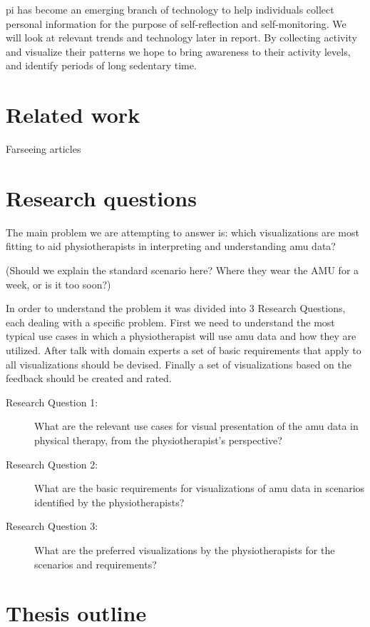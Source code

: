 \gls{pi} has become an emerging branch of technology to help individuals collect personal information for the purpose of self-reflection and self-monitoring. We will look at relevant trends and technology later in report. By collecting activity and visualize their patterns we hope to bring awareness to their activity levels, and identify periods of long sedentary time. 

\section{Related work}
Farseeing articles
\section{Research questions}
The main problem we are attempting to answer is: which visualizations are most fitting to aid physiotherapists in interpreting and understanding \gls{amu} data?

(Should we explain the standard scenario here? Where they wear the AMU for a week, or is it too soon?)

In order to understand the problem it was divided into 3 Research Questions, each dealing with a specific problem. First we need to understand the most typical use cases in which a physiotherapist will use \gls{amu} data and how they are utilized. After talk with domain experts a set of basic requirements that apply to all visualizations should be devised. Finally a set of visualizations based on the feedback should be created and rated.

\begin{description}
\item[Research Question 1:] What are the relevant use cases for visual presentation of the \gls{amu} data in physical therapy, from the physiotherapist's perspective?

\item[Research Question 2:] What are the basic requirements for visualizations of \gls{amu} data in scenarios identified by the physiotherapists?

\item[Research Question 3:] What are the preferred visualizations by the physiotherapists for the scenarios and requirements?

\end{description}



\section{Thesis outline}